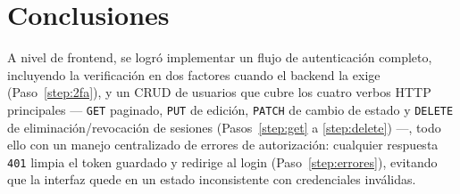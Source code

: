 \documentclass[12pt,a4paper]{article}
\begin{document}
\section{Conclusiones}\label{sec:conclusiones}

A nivel de frontend, se logró implementar un flujo de autenticación completo, incluyendo la verificación en dos factores cuando el backend la exige (Paso~\ref{step:2fa}), y un CRUD de usuarios que cubre los cuatro verbos HTTP principales --- \texttt{GET} paginado, \texttt{PUT} de edición, \texttt{PATCH} de cambio de estado y \texttt{DELETE} de eliminación/revocación de sesiones (Pasos~\ref{step:get} a \ref{step:delete}) ---, todo ello con un manejo centralizado de errores de autorización: cualquier respuesta \texttt{401} limpia el token guardado y redirige al login (Paso~\ref{step:errores}), evitando que la interfaz quede en un estado inconsistente con credenciales inválidas.
\end{document}

